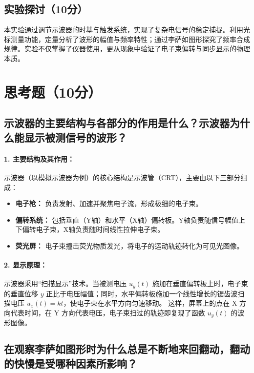 \documentclass[]{../template/Report}%
\begin{document}
\subsection{实验探讨（10分）}

本实验通过调节示波器的时基与触发系统，实现了复杂电信号的稳定捕捉。利用光标测量功能，定量分析了波形的幅值与频率特性；通过李萨如图形探究了频率合成规律。实验不仅掌握了仪器使用，更从现象中验证了电子束偏转与同步显示的物理本质。
\section{思考题（10分）}

\subsection{示波器的主要结构与各部分的作用是什么？示波器为什么能显示被测信号的波形？}

\paragraph{1. 主要结构及其作用：}
示波器（以模拟示波器为例）的核心结构是示波管（CRT），主要由以下三部分组成：
\begin{itemize}
    \item \textbf{电子枪：} 负责发射、加速并聚焦电子流，形成极细的电子束。
    \item \textbf{偏转系统：} 包括垂直（Y轴）和水平（X轴）偏转板。Y轴负责随信号幅值上下偏转电子束，X轴负责随时间线性拉伸电子束。
    \item \textbf{荧光屏：} 电子束撞击荧光物质发光，将电子的运动轨迹转化为可见光图像。
\end{itemize}

\paragraph{2. 显示原理：}
示波器采用“扫描显示”技术。当被测电压 $u_y(t)$ 施加在垂直偏转板上时，电子束的垂直位移 $y$ 正比于电压幅值；同时，水平偏转板施加一个线性增长的锯齿波扫描电压 $u_x(t) = kt$，使电子束在水平方向匀速移动。
这样，屏幕上的点在 X 方向代表时间，在 Y 方向代表电压，电子束扫过的轨迹即复现了函数 $u_y(t)$ 的波形图像。

\subsection{在观察李萨如图形时为什么总是不断地来回翻动，翻动的快慢是受哪种因素所影响？}
\end{document}
